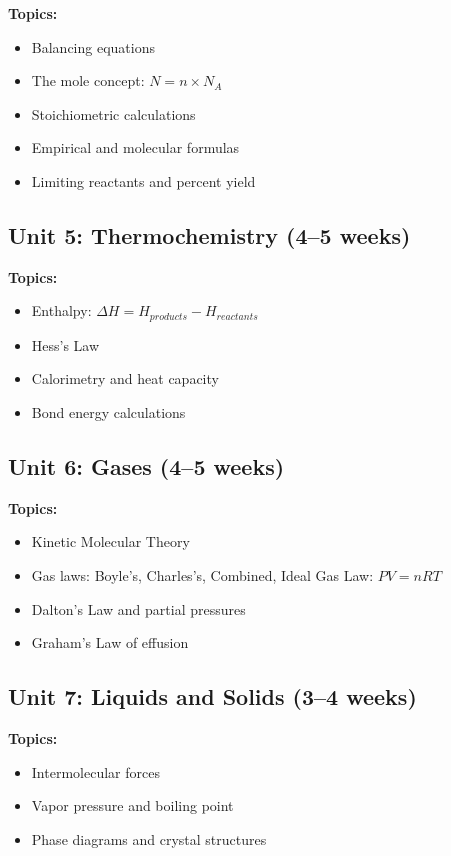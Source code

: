 \documentclass[12pt,oneside]{book}
\begin{document}
\textbf{Topics:}
\begin{itemize}
    \item Balancing equations
    \item The mole concept: $N = n \times N_A$
    \item Stoichiometric calculations
    \item Empirical and molecular formulas
    \item Limiting reactants and percent yield
\end{itemize}

\subsection{Unit 5: Thermochemistry (4--5 weeks)}

\textbf{Topics:}
\begin{itemize}
    \item Enthalpy: $\Delta H = H_{products} - H_{reactants}$
    \item Hess's Law
    \item Calorimetry and heat capacity
    \item Bond energy calculations
\end{itemize}

\subsection{Unit 6: Gases (4--5 weeks)}

\textbf{Topics:}
\begin{itemize}
    \item Kinetic Molecular Theory
    \item Gas laws: Boyle's, Charles's, Combined, Ideal Gas Law: $PV = nRT$
    \item Dalton's Law and partial pressures
    \item Graham's Law of effusion
\end{itemize}

\subsection{Unit 7: Liquids and Solids (3--4 weeks)}

\textbf{Topics:}
\begin{itemize}
    \item Intermolecular forces
    \item Vapor pressure and boiling point
    \item Phase diagrams and crystal structures
\end{itemize}
\end{document}
